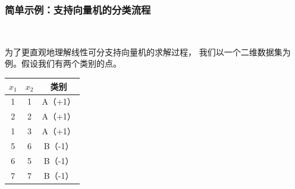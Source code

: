 \subsubsection{简单示例：支持向量机的分类流程}~\label{sec:SVM_exs}


为了更直观地理解线性可分支持向量机的求解过程，
我们以一个二维数据集为例。假设我们有两个类别的点。
\begin{center}
\begin{tabular}{ccc}
\toprule
$x_1$ & $x_2$ & 类别 \\
\midrule
1 & 1 & A（+1） \\
2 & 2 & A（+1） \\
1 & 3 & A（+1） \\
5 & 6 & B（-1） \\
6 & 5 & B（-1） \\7 & 7 & B（-1） \\
\bottomrule
\end{tabular}
\end{center}


